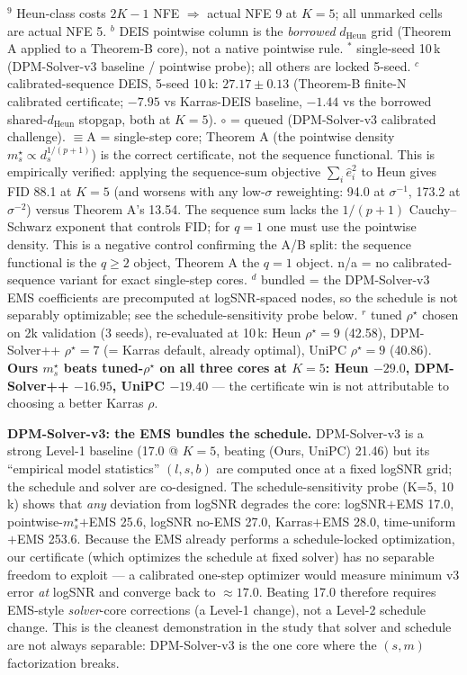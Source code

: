\documentclass[11pt]{article}
\begin{document}
\noindent
\(^9\) Heun-class costs \(2K{-}1\) NFE \(\Rightarrow\) actual NFE 9 at
\(K{=}5\); all unmarked cells are actual NFE 5.
\(^b\) DEIS pointwise column is the \emph{borrowed} \(d_{\mathrm{Heun}}\)
grid (Theorem A applied to a Theorem-B core), not a native pointwise
rule.
\(^*\) single-seed 10\,k (DPM-Solver-v3 baseline / pointwise probe);
all others are locked 5-seed.
\(^c\) calibrated-sequence DEIS, 5-seed 10\,k: \(27.17{\pm}0.13\) (Theorem-B
finite-N calibrated certificate; \(-7.95\) vs Karras-DEIS baseline,
\(-1.44\) vs the borrowed shared-\(d_{\mathrm{Heun}}\) stopgap, both at
\(K{=}5\)).
\(\circ\) = queued (DPM-Solver-v3 calibrated challenge).
\(\equiv\)A = single-step core; Theorem A (the pointwise density
\(m_s^\star\propto d_s^{1/(p+1)}\)) is the correct certificate, not the
sequence functional. This is empirically verified: applying the
sequence-sum objective \(\sum_i\hat e_i^2\) to Heun gives FID 88.1 at
\(K{=}5\) (and worsens with any low-\(\sigma\) reweighting: 94.0 at
\(\sigma^{-1}\), 173.2 at \(\sigma^{-2}\)) versus Theorem A's 13.54. The
sequence sum lacks the \(1/(p{+}1)\) Cauchy--Schwarz exponent that
controls FID; for \(q{=}1\) one must use the pointwise density. This is
a negative control confirming the A/B split: the sequence functional is
the \(q{\ge}2\) object, Theorem A the \(q{=}1\) object.
n/a = no calibrated-sequence variant for exact single-step cores.
\(^d\) bundled = the DPM-Solver-v3 EMS coefficients are precomputed at
logSNR-spaced nodes, so the schedule is not separably optimizable;
see the schedule-sensitivity probe below.
\(^r\) tuned \(\rho^\star\) chosen on 2k validation (3 seeds), re-evaluated
at 10\,k: Heun \(\rho^\star{=}9\) (42.58), DPM-Solver++ \(\rho^\star{=}7\)
(= Karras default, already optimal), UniPC \(\rho^\star{=}9\) (40.86).
\textbf{Ours \(m_s^\star\) beats tuned-\(\rho^\star\) on all three cores
at \(K{=}5\): Heun \(-29.0\), DPM-Solver++ \(-16.95\), UniPC \(-19.40\)}
--- the certificate win is not attributable to choosing a better Karras
\(\rho\).

\noindent\textbf{DPM-Solver-v3: the EMS bundles the schedule.} DPM-Solver-v3
is a strong Level-1 baseline (17.0 @ \(K{=}5\), beating (Ours, UniPC)
21.46) but its ``empirical model statistics'' \((l,s,b)\) are computed
once at a fixed logSNR grid; the schedule and solver are co-designed.
The schedule-sensitivity probe (K=5, 10\,k) shows that \emph{any}
deviation from logSNR degrades the core: logSNR\(+\)EMS 17.0,
pointwise-\(m_s^\star\)\(+\)EMS 25.6, logSNR no-EMS 27.0, Karras\(+\)EMS
28.0, time-uniform\(+\)EMS 253.6. Because the EMS already performs a
schedule-locked optimization, our certificate (which optimizes the
schedule at fixed solver) has no separable freedom to exploit --- a
calibrated one-step optimizer would measure minimum v3 error \emph{at}
logSNR and converge back to \(\approx 17.0\). Beating 17.0 therefore
requires EMS-style \emph{solver}-core corrections (a Level-1 change),
not a Level-2 schedule change. This is the cleanest demonstration in the
study that solver and schedule are not always separable: DPM-Solver-v3
is the one core where the \((s, m)\) factorization breaks.
\end{document}
